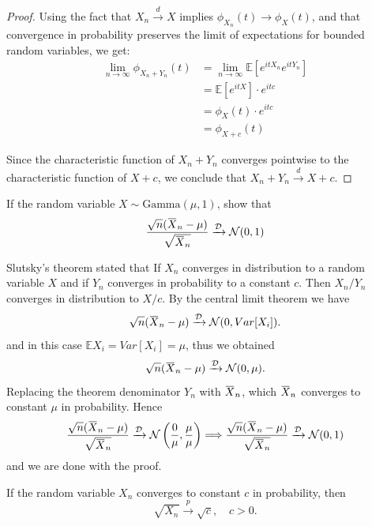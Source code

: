 \begin{proof}
    Using the fact that $X_n \xrightarrow{d} X$ implies $\phi_{X_n}(t) \to \phi_X(t)$, and that convergence in probability preserves the limit of expectations for bounded random variables, we get:
    \begin{align*}
        \lim_{n \to \infty} \phi_{X_n + Y_n}(t) &= \lim_{n \to \infty} \mathbb{E}[e^{itX_n}e^{itY_n}] \\
        &= \mathbb{E}[e^{itX}] \cdot e^{itc} \\
        &= \phi_X(t) \cdot e^{itc} \\
        &= \phi_{X + c}(t)
    \end{align*}
    
    Since the characteristic function of $X_n + Y_n$ converges pointwise to the characteristic function of $X + c$, we conclude that $X_n + Y_n \xrightarrow{d} X + c$.
\end{proof}

\begin{example}
    If the random variable $X \sim \text{Gamma}(\mu, 1)$, show that 
    \[
        \frac{\sqrt{n}(\ols{X}_n - \mu)}{\sqrt{\ols{X}_n}} \xrightarrow[]{\mathcal{D}} \mathcal{N}(0,1)
    \]
\end{example}
\begin{solution}
    Slutsky's theorem stated that If $X_n$ converges in distribution to a random variable 
    $X$ and if $Y_n$ converges in probability to a constant $c$. Then $X_n / Y_n$
    converges in distribution to $X/c$. By the central limit theorem we have 
    \[
        \sqrt{n}(\ols{X}_n - \mu) \xrightarrow[]{\mathcal{D}} \mathcal{N}(0, Var[X_i]).
    \]
    and in this case $\mathbb{E}X_i = Var[X_i] = \mu$, thus we obtained
    \[
        \sqrt{n}(\ols{X}_n - \mu) \xrightarrow[]{\mathcal{D}} \mathcal{N}(0, \mu).
    \]
    Replacing the theorem denominator $Y_n$ with $\ols{X}_n$, which $\ols{X}_n$ converges to constant $\mu$ 
    in probability. Hence
    \[
        \frac{\sqrt{n}(\ols{X}_n - \mu)}{\sqrt{\ols{X}_n}} \xrightarrow[]{\mathcal{D}} \mathcal{N}\left(\frac{0}{\mu}, \frac{\mu}{\mu}\right)
        \Longrightarrow \frac{\sqrt{n}(\ols{X}_n - \mu)}{\sqrt{\ols{X}_n}} \xrightarrow[]{\mathcal{D}} \mathcal{N}(0,1)
    \]
    and we are done with the proof.
\end{solution}

\begin{theorem}
    If the random variable $X_n$ converges to constant $c$ in probability, then 
    \begin{equation}
        \sqrt{X_n} \xrightarrow[]{p} \sqrt{c},\quad c > 0. 
    \end{equation}
\end{theorem}


